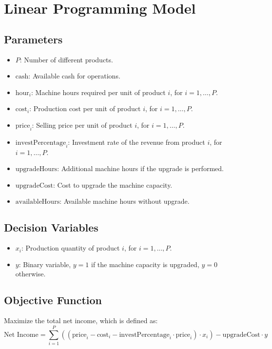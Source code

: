 \documentclass{article}
\begin{document}
\section*{Linear Programming Model}

\subsection*{Parameters}
\begin{itemize}
    \item $P$: Number of different products.
    \item $\text{cash}$: Available cash for operations.
    \item $\text{hour}_i$: Machine hours required per unit of product $i$, for $i = 1, \dots, P$.
    \item $\text{cost}_i$: Production cost per unit of product $i$, for $i = 1, \dots, P$.
    \item $\text{price}_i$: Selling price per unit of product $i$, for $i = 1, \dots, P$.
    \item $\text{investPercentage}_i$: Investment rate of the revenue from product $i$, for $i = 1, \dots, P$.
    \item $\text{upgradeHours}$: Additional machine hours if the upgrade is performed.
    \item $\text{upgradeCost}$: Cost to upgrade the machine capacity.
    \item $\text{availableHours}$: Available machine hours without upgrade.
\end{itemize}

\subsection*{Decision Variables}
\begin{itemize}
    \item $x_i$: Production quantity of product $i$, for $i = 1, \dots, P$.
    \item $y$: Binary variable, $y = 1$ if the machine capacity is upgraded, $y = 0$ otherwise.
\end{itemize}

\subsection*{Objective Function}
Maximize the total net income, which is defined as:
\[
\text{Net Income} = \sum_{i=1}^{P} \left( (\text{price}_i - \text{cost}_i - \text{investPercentage}_i \cdot \text{price}_i) \cdot x_i \right) - \text{upgradeCost} \cdot y
\]
\end{document}
